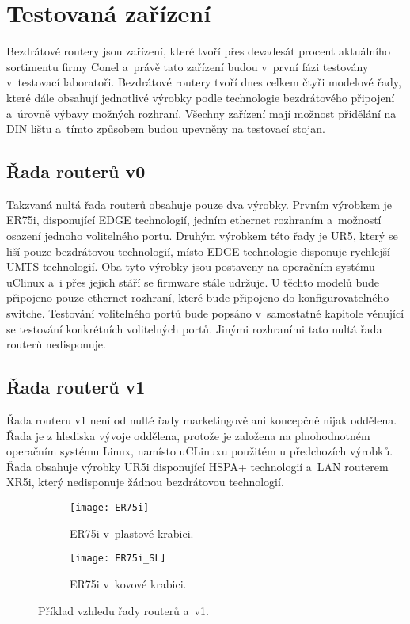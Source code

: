 \section{Testovaná zařízení}
Bezdrátové routery jsou zařízení, které tvoří přes devadesát procent aktuálního sortimentu firmy Conel a~právě tato zařízení budou v~první fázi testovány v~testovací laboratoři. Bezdrátové routery tvoří dnes celkem čtyři modelové řady, které dále obsahují jednotlivé výrobky podle technologie bezdrátového připojení a~úrovně výbavy možných rozhraní. Všechny zařízení mají možnost přidělání na DIN lištu a~tímto způsobem budou upevněny na testovací stojan.

\subsection{Řada routerů v0}
Takzvaná nultá řada routerů obsahuje pouze dva výrobky. Prvním výrobkem je ER75i, disponující EDGE technologií, jedním ethernet rozhraním a~možností osazení jednoho volitelného portu. Druhým výrobkem této řady je UR5, který se liší pouze bezdrátovou technologií, místo EDGE technologie disponuje rychlejší UMTS technologií. Oba tyto výrobky jsou postaveny na operačním systému uClinux a~i přes jejich stáří se firmware stále udržuje. U těchto modelů bude připojeno pouze ethernet rozhraní, které bude připojeno do konfigurovatelného switche. Testování volitelného portů bude popsáno v~samostatné kapitole věnující se testování konkrétních volitelných portů. Jinými rozhraními tato nultá řada routerů nedisponuje.

\subsection{Řada routerů v1}
Řada routeru v1 není od nulté řady marketingově ani koncepčně nijak oddělena. Řada je z hlediska vývoje oddělena, protože je založena na plnohodnotném operačním systému Linux, namísto uCLinuxu použitém u předchozích výrobků. Řada obsahuje výrobky UR5i disponující HSPA+ technologií a~LAN routerem XR5i, který nedisponuje žádnou bezdrátovou technologií.

\begin{figure}[h]
  \begin{subfigure}[h]{0.5\LW}
    \centering
    \texttt{[image: ER75i]}
    \caption{ER75i v~plastové krabici.}
    \label{fig:ER75i}
  \end{subfigure}
  \begin{subfigure}[h]{0.5\LW}
    \centering
    \texttt{[image: ER75i\_SL]}
    \caption{ER75i v~kovové krabici.}
    \label{fig:ER75i SL}
  \end{subfigure}
  \caption{Příklad vzhledu řady routerů a~v1.}
  \label{fig:ER75i}
\end{figure}

